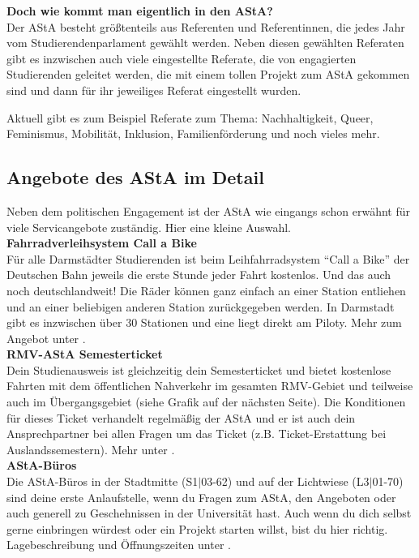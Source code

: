 {    


    \noindent\textbf{Doch wie kommt man eigentlich in den AStA?}\\
    Der AStA besteht größtenteils aus Referenten und Referentinnen, die jedes Jahr vom Studierendenparlament gewählt werden. Neben diesen gewählten Referaten gibt es inzwischen auch viele eingestellte Referate, die von engagierten Studierenden geleitet werden, die mit einem tollen Projekt zum AStA gekommen sind und dann für ihr jeweiliges Referat eingestellt wurden.

    Aktuell gibt es zum Beispiel Referate zum Thema: Nachhaltigkeit, Queer, Feminismus, Mobilität, Inklusion, Familienförderung und noch vieles mehr.\\
    \columnbreak

    \subsection*{Angebote des AStA im Detail}

    Neben dem politischen Engagement ist der AStA wie eingangs schon erwähnt für viele Servicangebote zuständig. Hier eine kleine Auswahl.\\

    \noindent\textbf{Fahrradverleihsystem Call a Bike}\\
    Für alle Darmstädter Studierenden ist beim Leihfahrradsystem "`Call a Bike"' der Deutschen Bahn jeweils die erste Stunde jeder Fahrt kostenlos. Und das auch noch deutschlandweit! Die Räder können ganz einfach an einer Station entliehen und an einer beliebigen anderen Station zurückgegeben werden. In Darmstadt gibt es inzwischen über 30 Stationen und eine liegt direkt am Piloty. Mehr zum Angebot unter \footnotemark[1].\\

    \noindent\textbf{RMV-AStA Semesterticket}\\
    Dein Studienausweis ist gleichzeitig dein Semesterticket und bietet kostenlose Fahrten mit dem öffentlichen Nahverkehr im gesamten RMV-Gebiet und teilweise auch im Übergangsgebiet (siehe Grafik auf der nächsten Seite). Die Konditionen für dieses Ticket verhandelt regelmäßig der AStA und er ist auch dein Ansprechpartner bei allen Fragen um das Ticket (z.B. Ticket-Erstattung bei Auslandssemestern). Mehr unter \footnotemark[2].\\

    \noindent\textbf{AStA-Büros}\\
    Die AStA-Büros in der Stadtmitte (S1$|$03-62) und auf der Lichtwiese (L3$|$01-70) sind deine erste Anlaufstelle, wenn du Fragen zum AStA, den Angeboten oder auch generell zu Geschehnissen in der Universität hast. Auch wenn du dich selbst gerne einbringen würdest oder ein Projekt starten willst, bist du hier richtig. Lagebeschreibung und Öffnungszeiten unter \footnotemark[3].\\

}
